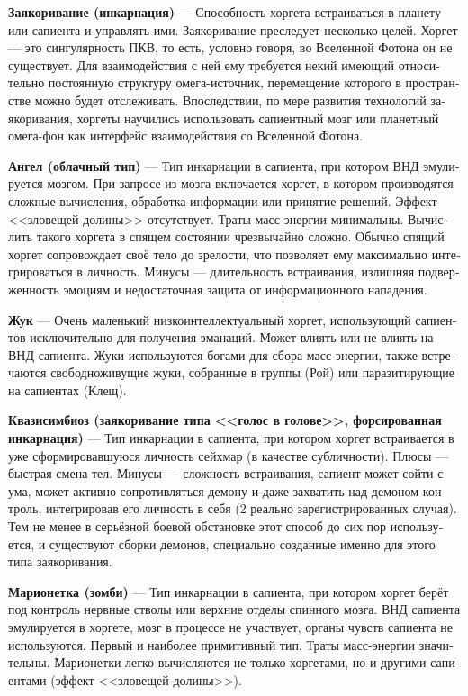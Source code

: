 \documentclass[a4paper,12pt,fleqn]{book}\usepackage{polyglossia}\setdefaultlanguage[babelshorthands=true]{russian}\setotherlanguage{english}\defaultfontfeatures{Ligatures=TeX,Mapping=tex-text}\usepackage{xcolor}\newcommand{\ml}[3]{#2}
\newcommand{\asterism}{\vspace{1em}{\centering\Large\bfseries$\ast~\ast~\ast$\par}\vspace{1em}}
\newcommand{\theterm}[3]{\textbf{\hypertarget{#1}{#2}} --- #3}
\begin{document}
\theterm{incarnation}
{Заякоривание (инкарнация)}
{Способность хоргета встраиваться в планету или сапиента и управлять ими.
Заякоривание преследует несколько целей.
Хоргет --- это сингулярность ПКВ, то есть, условно говоря, во Вселенной Фотона он не существует.
Для взаимодействия с ней ему требуется некий имеющий относительно постоянную структуру омега-источник, перемещение которого в пространстве можно будет отслеживать.
Впоследствии, по мере развития технологий заякоривания, хоргеты научились использовать сапиентный мозг или планетный омега-фон как интерфейс взаимодействия со Вселенной Фотона.}

\asterism

\theterm{anjel}
{Ангел (облачный тип)}
{Тип инкарнации в сапиента, при котором ВНД эмулируется мозгом.
При запросе из мозга включается хоргет, в котором производятся сложные вычисления, обработка информации или принятие решений.
Эффект <<зловещей долины>> отсутствует.
Траты масс-энергии минимальны.
Вычислить такого хоргета в спящем состоянии чрезвычайно сложно.
Обычно спящий хоргет сопровождает своё тело до зрелости, что позволяет ему максимально интегрироваться в личность.
Минусы --- длительность встраивания, излишняя подверженность эмоциям и недостаточная защита от информационного нападения.}

\theterm{bug}
{Жук}
{Очень маленький низкоинтеллектуальный хоргет, использующий сапиентов исключительно для получения эманаций.
Может влиять или не влиять на ВНД сапиента.
Жуки используются богами для сбора масс-энергии, также встречаются свободноживущие жуки, собранные в группы (Рой) или паразитирующие на сапиентах (Клещ).}

\theterm{quasisimbiosis}
{Квазисимбиоз (заякоривание типа <<голос в голове>>, форсированная инкарнация)}
{Тип инкарнации в сапиента, при котором хоргет встраивается в уже сформировавшуюся личность сейхмар (в качестве субличности).
Плюсы --- быстрая смена тел.
Минусы --- сложность встраивания, сапиент может сойти с ума, может активно сопротивляться демону и даже захватить над демоном контроль, интегрировав его личность в себя (2 реально зарегистрированных случая).
Тем не менее в серьёзной боевой обстановке этот способ до сих пор используется, и существуют сборки демонов, специально созданные именно для этого типа заякоривания.}

\theterm{zombie}
{Марионетка (зомби)}
{Тип инкарнации в сапиента, при котором хоргет берёт под контроль нервные стволы или верхние отделы спинного мозга.
ВНД сапиента эмулируется в хоргете, мозг в процессе не участвует, органы чувств сапиента не используются.
Первый и наиболее примитивный тип.
Траты масс-энергии значительны.
Марионетки легко вычисляются не только хоргетами, но и другими сапиентами (эффект <<зловещей долины>>).}
\end{document}
